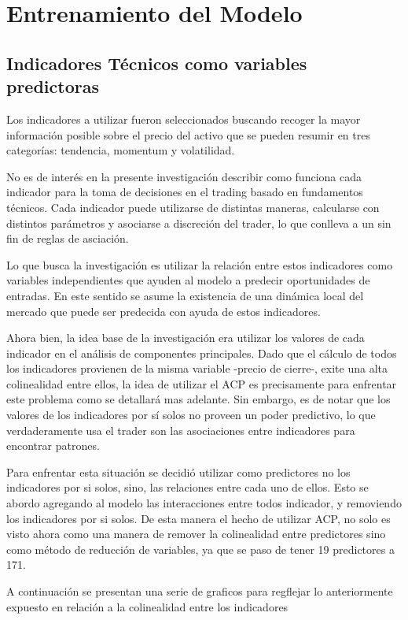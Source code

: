 \documentclass[a4paper,12pt]{Latex/Classes/PhDthesisPSnPDF}
\begin{document}
\section{Entrenamiento del Modelo}

\subsection{Indicadores Técnicos como variables predictoras}

Los indicadores a utilizar fueron seleccionados buscando recoger la mayor información posible sobre el precio del activo que se pueden resumir en tres categorías: tendencia, momentum y volatilidad.

No es de interés en la presente investigación describir como funciona cada indicador para la toma de decisiones en el trading basado en fundamentos técnicos. Cada indicador puede utilizarse de distintas maneras, calcularse con distintos parámetros y asociarse a discreción del trader, lo que conlleva a un sin fin de reglas de asciación. 

Lo que busca la investigación es utilizar la relación entre estos indicadores como variables independientes que ayuden al modelo a predecir oportunidades de entradas. En este sentido se asume la existencia de una dinámica local del mercado que puede ser predecida con ayuda de estos indicadores.

Ahora bien, la idea base de la investigación era utilizar los valores de cada indicador en el análisis de componentes principales. Dado que el cálculo de todos los indicadores provienen de la misma variable -precio de cierre-, exite una alta colinealidad entre ellos, la idea de utilizar el ACP es precisamente para enfrentar este problema como se detallará mas adelante. Sin embargo, es de notar que los valores de los indicadores por sí solos no proveen un poder predictivo, lo que verdaderamente usa el trader son las asociaciones entre indicadores para encontrar patrones. 

Para enfrentar esta situación se decidió utilizar como predictores no los indicadores por si solos, sino, las relaciones entre cada uno de ellos. Esto se abordo agregando al modelo las interacciones entre todos indicador, y removiendo los indicadores por si solos. De esta manera el hecho de utilizar ACP, no solo es visto ahora como una manera de remover la colinealidad entre predictores sino como método de reducción de variables, ya que se paso de tener 19 predictores a 171.

A continuación se presentan una serie de graficos para regflejar lo anteriormente expuesto en relación a la colinealidad entre los indicadores
\end{document}
